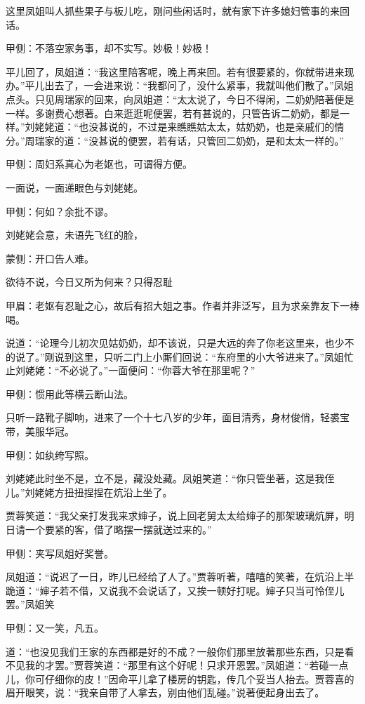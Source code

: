 \begin{parag}
    这里凤姐叫人抓些果子与板儿吃，刚问些闲话时，就有家下许多媳妇管事的来回话。\begin{note}甲侧：不落空家务事，却不实写。妙极！妙极！\end{note}平儿回了，凤姐道：“我这里陪客呢，晚上再来回。若有很要紧的，你就带进来现办。”平儿出去了，一会进来说：“我都问了，没什么紧事，我就叫他们散了。”凤姐点头。只见周瑞家的回来，向凤姐道：“太太说了，今日不得闲，二奶奶陪著便是一样。多谢费心想著。白来逛逛呢便罢，若有甚说的，只管告诉二奶奶，都是一样。”刘姥姥道：“也没甚说的，不过是来瞧瞧姑太太，姑奶奶，也是亲戚们的情分。”周瑞家的道：“没甚说的便罢，若有话，只管回二奶奶，是和太太一样的。”\begin{note}甲侧：周妇系真心为老妪也，可谓得方便。\end{note}一面说，一面递眼色与刘姥姥。\begin{note}甲侧：何如？余批不谬。\end{note}刘姥姥会意，未语先飞红的脸，\begin{note}蒙侧：开口告人难。\end{note}欲待不说，今日又所为何来？只得忍耻\begin{note}甲眉：老妪有忍耻之心，故后有招大姐之事。作者并非泛写，且为求亲靠友下一棒喝。\end{note}说道：“论理今儿初次见姑奶奶，却不该说，只是大远的奔了你老这里来，也少不的说了。”刚说到这里，只听二门上小厮们回说：“东府里的小大爷进来了。”凤姐忙止刘姥姥：“不必说了。”一面便问：“你蓉大爷在那里呢？”\begin{note}甲侧：惯用此等横云断山法。\end{note}只听一路靴子脚响，进来了一个十七八岁的少年，面目清秀，身材俊俏，轻裘宝带，美服华冠。\begin{note}甲侧：如纨绔写照。\end{note}刘姥姥此时坐不是，立不是，藏没处藏。凤姐笑道：“你只管坐著，这是我侄儿。”刘姥姥方扭扭捏捏在炕沿上坐了。
\end{parag}


\begin{parag}
    贾蓉笑道：“我父亲打发我来求婶子，说上回老舅太太给婶子的那架玻璃炕屏，明日请一个要紧的客，借了略摆一摆就送过来的。”\begin{note}甲侧：夹写凤姐好奖誉。\end{note}凤姐道：“说迟了一日，昨儿已经给了人了。”贾蓉听著，嘻嘻的笑著，在炕沿上半跪道：“婶子若不借，又说我不会说话了，又挨一顿好打呢。婶子只当可怜侄儿罢。”凤姐笑\begin{note}甲侧：又一笑，凡五。\end{note}道：“也没见我们王家的东西都是好的不成？一般你们那里放著那些东西，只是看不见我的才罢。”贾蓉笑道：“那里有这个好呢！只求开恩罢。”凤姐道：“若碰一点儿，你可仔细你的皮！”因命平儿拿了楼房的钥匙，传几个妥当人抬去。贾蓉喜的眉开眼笑，说：“我亲自带了人拿去，别由他们乱碰。”说著便起身出去了。
\end{parag}


